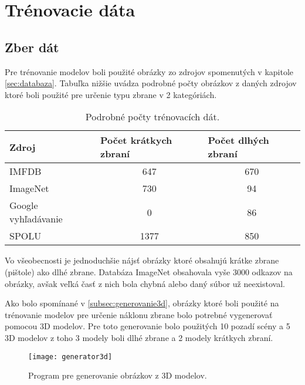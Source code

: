 
\section{Trénovacie dáta}
\label{sec:trenovaciedata}

\subsection{Zber dát}
Pre trénovanie modelov boli použité obrázky zo zdrojov spomenutých v kapitole \ref{sec:databaza}.
Tabuľka nižšie uvádza podrobné počty obrázkov z daných zdrojov ktoré boli použité pre určenie typu zbrane v 2 kategóriách.

\begin{table}[H]
  \centering
  \label{my-label}
  \begin{tabular}{|l|c|c|}
    \hline
    Zdroj               & \multicolumn{1}{l|}{Počet krátkych zbraní} & \multicolumn{1}{l|}{Počet dlhých zbraní} \\ \hline
    IMFDB               & 647                                        & 670                                      \\ \hline
    ImageNet            & 730                                        & 94                                       \\ \hline
    Google vyhľadávanie & 0                                          & 86                                       \\ \hline \hline
    SPOLU               & 1377                                       & 850                                      \\ \hline
  \end{tabular}
  \caption{Podrobné počty trénovacích dát.}
\end{table}

Vo všeobecnosti je jednoduchšie nájsť obrázky ktoré obsahujú krátke zbrane (pištole) ako dlhé zbrane.
Databáza ImageNet obsahovala vyše 3000 odkazov na obrázky, avšak veľká časť z nich bola chybná alebo daný súbor už neexistoval.

Ako bolo spomínané v \ref{subsec:generovanie3d}, obrázky ktoré boli použité na trénovanie modelov pre určenie náklonu zbrane bolo potrebné
    vygenerovať pomocou 3D modelov.
Pre toto generovanie bolo použitých 10 pozadí scény a 5 3D modelov z toho 3 modely boli dlhé zbrane a 2 modely krátkych zbraní.

\begin{figure}[H]
    \centering
    \texttt{[image: generator3d]}
    \caption{Program pre generovanie obrázkov z 3D modelov.}
    \label{pic:generator3d}
\end{figure}

